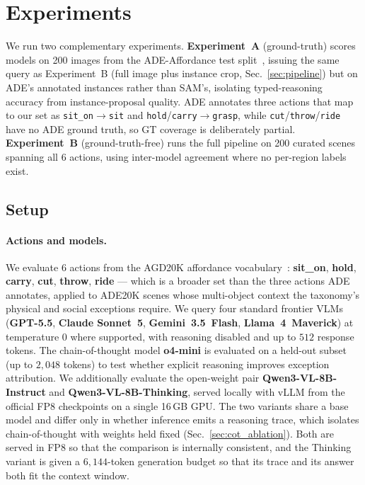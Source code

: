 \documentclass[runningheads]{llncs}
\newcommand{\numimages}{200}      %
\newcommand{\numactions}{6}
\begin{document}
\section{Experiments}
\label{sec:experiments}

We run two complementary experiments.
\textbf{Experiment~A} (ground-truth) scores models on 200 images from the ADE-Affordance test split~\cite{ade_affordance}, issuing the same query as Experiment~B (full image plus instance crop, Sec.~\ref{sec:pipeline}) but on ADE's annotated instances rather than SAM's, isolating typed-reasoning accuracy from instance-proposal quality.
ADE annotates three actions that map to our set as \texttt{sit\_on}$\rightarrow$\texttt{sit} and \texttt{hold}/\texttt{carry}$\rightarrow$\texttt{grasp}, while \texttt{cut}/\texttt{throw}/\texttt{ride} have no ADE ground truth, so GT coverage is deliberately partial.
\textbf{Experiment~B} (ground-truth-free) runs the full pipeline on \numimages{} curated scenes spanning all \numactions{} actions, using inter-model agreement where no per-region labels exist.

\subsection{Setup}
\label{sec:setup}

\paragraph{Actions and models.}
We evaluate \numactions{} actions from the AGD20K affordance vocabulary~\cite{agd20k}: \textbf{sit\_on}, \textbf{hold}, \textbf{carry}, \textbf{cut}, \textbf{throw}, \textbf{ride} --- which is a broader set than the three actions ADE annotates, applied to ADE20K scenes whose multi-object context the taxonomy's physical and social exceptions require.
We query four standard frontier VLMs (\textbf{GPT-5.5}, \textbf{Claude Sonnet~5}, \textbf{Gemini~3.5~Flash}, \textbf{Llama~4~Maverick}) at temperature $0$ where supported, with reasoning disabled and up to $512$ response tokens.
The chain-of-thought model \textbf{o4-mini} is evaluated on a held-out subset (up to $2{,}048$ tokens) to test whether explicit reasoning improves exception attribution.
We additionally evaluate the open-weight pair \textbf{Qwen3-VL-8B-Instruct} and \textbf{Qwen3-VL-8B-Thinking}, served locally with vLLM from the official FP8 checkpoints on a single 16\,GB GPU.
The two variants share a base model and differ only in whether inference emits a reasoning trace, which isolates chain-of-thought with weights held fixed (Sec.~\ref{sec:cot_ablation}).
Both are served in FP8 so that the comparison is internally consistent, and the Thinking variant is given a $6{,}144$-token generation budget so that its trace and its answer both fit the context window.
\end{document}
